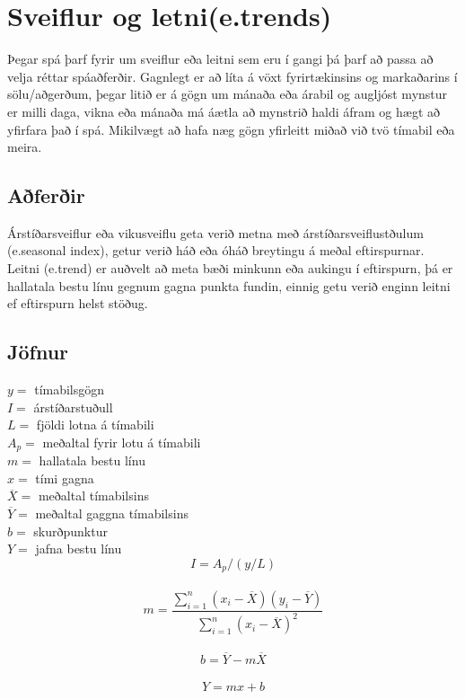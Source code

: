 \section {Sveiflur og letni(e.trends)}
 
Þegar spá þarf fyrir um sveiflur eða leitni sem eru í gangi þá þarf að passa að velja réttar spáaðferðir. Gagnlegt er að líta á vöxt fyrirtækinsins og markaðarins í sölu/aðgerðum, þegar litið er á gögn um mánaða eða árabil og augljóst mynstur er milli daga, vikna eða mánaða má áætla að mynstrið haldi áfram og hægt að yfirfara það í spá. Mikilvægt að hafa næg gögn yfirleitt miðað við tvö tímabil eða meira. \cite{WhatIsTrendForecasting}

\subsection{Aðferðir}
Árstíðarsveiflur eða vikusveiflu geta verið metna með árstíðarsveiflustðulum (e.seasonal index), getur verið háð eða óháð breytingu á meðal eftirspurnar. Leitni (e.trend) er auðvelt að meta bæði minkunn eða aukingu í eftirspurn, þá er hallatala bestu línu gegnum gagna punkta fundin, einnig getu verið enginn leitni ef eftirspurn helst stöðug.\cite{TrendLine}


\subsection{Jöfnur}

	$y=$ tímabilsgögn \\
	$I=$ árstíðarstuðull \\
	$L=$ fjöldi lotna á tímabili \\
	$A_p=$ meðaltal fyrir lotu á tímabili \\
	$m=$ hallatala bestu línu \\
	$x=$ tími gagna \\
	$\overline{X} = $ meðaltal tímabilsins \\
	$\overline{Y}= $ meðaltal gaggna tímabilsins \\
	$ b= $ skurðpunktur \\
	$ Y= $ jafna bestu línu \\

	$$ I=  A_p/(y/L) $$ \\
	$$ m= \frac{\sum_{i=1}^{n} (x_{i}-\overline{X})(y_{i}-\overline{Y})}{\sum_{i=1}^{n} (x_{i}-\overline{X})^{2}} $$ \\	
	$$ b=  \overline {Y} -m\overline{X} $$ \\
	$$ Y=  mx+b $$ \\